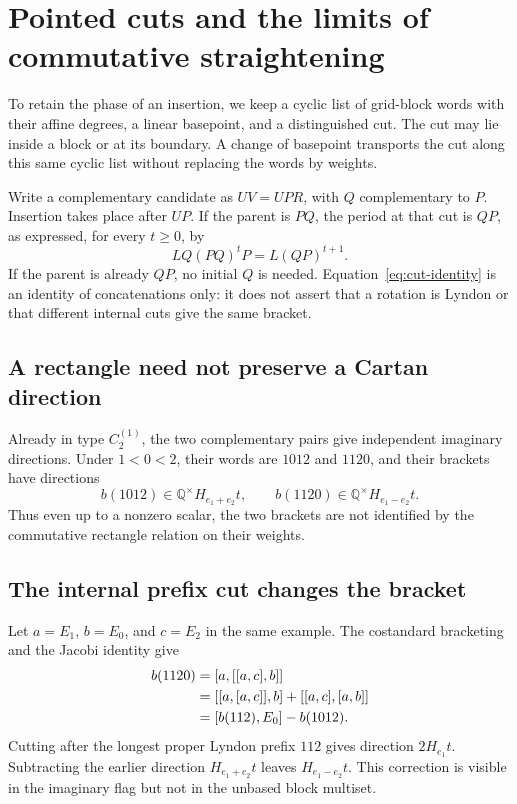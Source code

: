 \documentclass[11pt]{amsart}
\numberwithin{equation}{section}
\theoremstyle{definition}
\newcommand{\Q}{\mathbb Q}
\newcommand{\br}[1]{b(#1)}
\begin{document}
\section{Pointed cuts and the limits of commutative straightening}\label{sec:cuts}

To retain the phase of an insertion, we keep a cyclic list of grid-block words with their affine degrees, a linear basepoint, and a distinguished cut. The cut may lie inside a block or at its boundary. A change of basepoint transports the cut along this same cyclic list without replacing the words by weights.

Write a complementary candidate as $UV=UPR$, with $Q$ complementary to $P$. Insertion takes place after $UP$. If the parent is $PQ$, the period at that cut is $QP$, as expressed, for every $t\geq0$, by
\begin{equation}\label{eq:cut-identity}
 LQ(PQ)^tP=L(QP)^{t+1}.
\end{equation}
If the parent is already $QP$, no initial $Q$ is needed. Equation~\eqref{eq:cut-identity} is an identity of concatenations only: it does not assert that a rotation is Lyndon or that different internal cuts give the same bracket.

\subsection{A rectangle need not preserve a Cartan direction}
Already in type $C_2^{(1)}$, the two complementary pairs give independent imaginary directions. Under $1<0<2$, their words are $1012$ and $1120$, and their brackets have directions
\[
 \br{1012}\in\Q^{\times}H_{e_1+e_2}t,
 \qquad
 \br{1120}\in\Q^{\times}H_{e_1-e_2}t.
\]
Thus even up to a nonzero scalar, the two brackets are not identified by the commutative rectangle relation on their weights.

\subsection{The internal prefix cut changes the bracket}
Let $a=E_1$, $b=E_0$, and $c=E_2$ in the same example. The costandard bracketing and the Jacobi identity give
\begin{align}
 \br{1120}
 &=[a,[[a,c],b]]\notag\\
 &=[[a,[a,c]],b]+[[a,c],[a,b]]\notag\\
 &=[\br{112},E_0]-\br{1012}.
 \label{eq:ranktwo-cut}
\end{align}
Cutting after the longest proper Lyndon prefix $112$ gives direction $2H_{e_1}t$. Subtracting the earlier direction $H_{e_1+e_2}t$ leaves $H_{e_1-e_2}t$. This correction is visible in the imaginary flag but not in the unbased block multiset.
\end{document}
